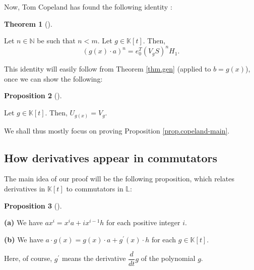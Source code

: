 \documentclass[numbers=enddot,12pt,final,onecolumn,notitlepage]{scrartcl}%
\theoremstyle{definition}
\newtheorem{theo}{Theorem}[section]
\newenvironment{theorem}[1][]
{\begin{theo}[#1]\begin{leftbar}}
{\end{leftbar}\end{theo}}
\newtheorem{prop}[theo]{Proposition}
\newenvironment{proposition}[1][]
{\begin{prop}[#1]\begin{leftbar}}
{\end{leftbar}\end{prop}}
\begin{document}
Now, Tom Copeland has found the following identity \cite{MO337766}:

\begin{theorem}
\label{thm.copeland}Let $n\in\mathbb{N}$ be such that $n<m$. Let
$g\in\mathbb{K}\left[  t\right]  $. Then,%
\[
\left(  g\left(  x\right)  \cdot a\right)  ^{n}=e_{0}^{T}\left(
V_{g}S\right)  ^{n}H_{1}.
\]

\end{theorem}

This identity will easily follow from Theorem \ref{thm.gen} (applied to
$b=g\left(  x\right)  $), once we can show the following:

\begin{proposition}
\label{prop.copeland-main}Let $g\in\mathbb{K}\left[  t\right]  $. Then,
$U_{g\left(  x\right)  }=V_{g}$.
\end{proposition}

We shall thus mostly focus on proving Proposition \ref{prop.copeland-main}.

\subsection{How derivatives appear in commutators}

The main idea of our proof will be the following proposition, which relates
derivatives in $\mathbb{K}\left[  t\right]  $ to commutators in $\mathbb{L}$:

\begin{proposition}
\label{prop.deriv1}\textbf{(a)} We have $ax^{i}=x^{i}a+ix^{i-1}h$ for each
positive integer $i$.

\textbf{(b)} We have $a\cdot g\left(  x\right)  =g\left(  x\right)  \cdot
a+g^{\prime}\left(  x\right)  \cdot h$ for each $g\in\mathbb{K}\left[
t\right]  $.
\end{proposition}

Here, of course, $g^{\prime}$ means the derivative $\dfrac{d}{dt}g$ of the
polynomial $g$.
\end{document}
